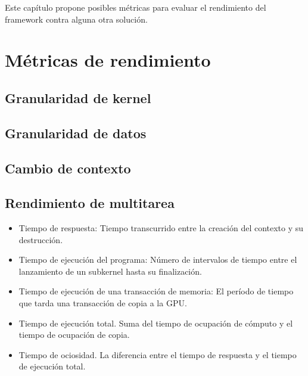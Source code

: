 Este capítulo propone posibles métricas para evaluar el rendimiento del framework contra alguna otra solución.

\section{Métricas de rendimiento}

\subsection {Granularidad de kernel}

\subsection{Granularidad de datos}

\subsection {Cambio de contexto}

\subsection {Rendimiento de multitarea}

\begin{itemize}
\item Tiempo de respuesta: Tiempo transcurrido entre la creación del contexto y su destrucción.
\item Tiempo de ejecución del programa: Número de intervalos de tiempo entre el lanzamiento de un subkernel hasta su finalización.
\item Tiempo de ejecución de una transacción de memoria: El período de tiempo que tarda una transacción de copia a la GPU.
\item Tiempo de ejecución total. Suma del tiempo de ocupación de cómputo y el tiempo de ocupación de copia.
\item Tiempo de ociosidad. La diferencia entre el tiempo de respuesta y el tiempo de ejecución total.

\end{itemize}



